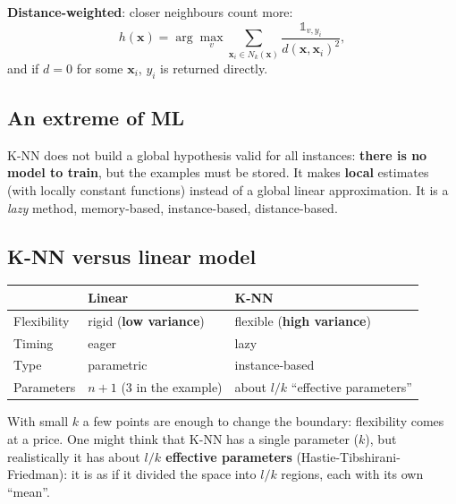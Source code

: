 \textbf{Distance-weighted}: closer neighbours count more: \[
h(\mathbf{x}) = \arg\max_v \sum_{\mathbf{x}_i \in N_k(\mathbf{x})} \frac{\mathbb{1}_{v, y_i}}{d(\mathbf{x}, \mathbf{x}_i)^2},
\] and if \(d = 0\) for some \(\mathbf{x}_i\), \(y_i\) is returned
directly.

\subsection{An extreme of ML}\label{un-estremo-del-ml}

K-NN does not build a global hypothesis valid for all instances:
\textbf{there is no model to train}, but the examples must be stored.
It makes \textbf{local} estimates (with locally constant functions)
instead of a global linear approximation. It is a \emph{lazy} method,
memory-based, instance-based, distance-based.

\subsection{K-NN versus linear
model}\label{k-nn-contro-modello-lineare}

{\def\LTcaptype{none} %
\begin{longtable}[]{@{}
  >{\raggedright\arraybackslash}p{}
  >{\raggedright\arraybackslash}p{}
  >{\raggedright\arraybackslash}p{}@{}}
\toprule\noalign{}
\begin{minipage}[b]{\linewidth}\raggedright
\end{minipage} & \begin{minipage}[b]{\linewidth}\raggedright
Linear
\end{minipage} & \begin{minipage}[b]{\linewidth}\raggedright
K-NN
\end{minipage} \\
\midrule\noalign{}
\endhead
\bottomrule\noalign{}
\endlastfoot
Flexibility & rigid (\textbf{low variance}) & flexible (\textbf{high
variance}) \\
Timing & eager & lazy \\
Type & parametric & instance-based \\
Parameters & \(n+1\) (3 in the example) & about \(l/k\) ``effective
parameters'' \\
\end{longtable}
}

With small \(k\) a few points are enough to change the boundary:
flexibility comes at a price. One might think that K-NN has a single
parameter (\(k\)), but realistically it has about \textbf{\(l/k\)
effective parameters} (Hastie-Tibshirani-Friedman): it is as if it
divided the space into \(l/k\) regions, each with its own ``mean''.

